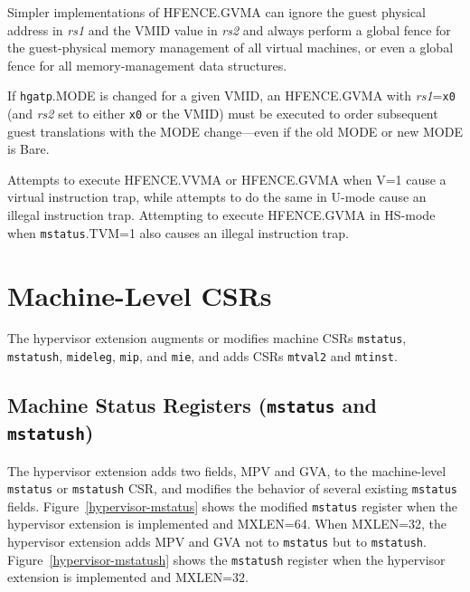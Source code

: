 \begin{commentary}
Simpler implementations of HFENCE.GVMA can ignore the guest physical address in
{\em rs1} and the VMID value in {\em rs2} and always perform a global fence for
the guest-physical memory management of all virtual machines, or even a global
fence for all memory-management data structures.
\end{commentary}

If {\tt hgatp}.MODE is changed for a given VMID, an HFENCE.GVMA with
{\em rs1}={\tt x0} (and {\em rs2} set to either {\tt x0} or the VMID) must
be executed to order subsequent guest translations with the MODE
change---even if the old MODE or new MODE is Bare.

Attempts to execute HFENCE.VVMA or HFENCE.GVMA when V=1 cause a virtual
instruction trap, while attempts to do the same in U-mode
cause an illegal instruction trap.
Attempting to execute HFENCE.GVMA in HS-mode when {\tt mstatus}.TVM=1
also causes an illegal instruction trap.

\section{Machine-Level CSRs}

The hypervisor extension augments or modifies machine CSRs {\tt mstatus},
{\tt mstatush}, {\tt mideleg}, {\tt mip}, and {\tt mie}, and
adds CSRs {\tt mtval2} and {\tt mtinst}.

\subsection{Machine Status Registers ({\tt mstatus} and {\tt mstatush})}

The hypervisor extension adds two fields, MPV and GVA, to the
machine-level {\tt mstatus} or {\tt mstatush} CSR, and modifies the
behavior of several existing {\tt mstatus} fields.
Figure~\ref{hypervisor-mstatus} shows the modified {\tt mstatus} register
when the hypervisor extension is implemented and MXLEN=64.
When MXLEN=32, the hypervisor extension adds MPV and GVA not to {\tt mstatus}
but to {\tt mstatush}.
Figure~\ref{hypervisor-mstatush} shows the {\tt mstatush} register when
the hypervisor extension is implemented and MXLEN=32.

